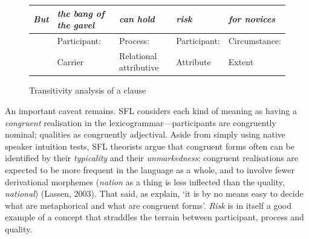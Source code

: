 \begin{figure}[htb]
\centering \small \onehalfspacing
\begin{tabularx}{0.75\textwidth}{|l|l|X|X|X|}
\hline
\emph{But}     & \emph{the bang of the gavel}             & \emph{can hold}          & \emph{risk} & \emph{for novices}          \\ \hline
~ & Participant: & Process: & Participant: & Circumstance:  \\
~ & Carrier & Relational \mbox{attributive} & Attribute &  Extent \\ \hline
\end{tabularx}
\caption{Transitivity analysis of a clause}
\label{fig:transannotation}
\end{figure}

An important caveat remains. SFL considers each kind of meaning as having a \emph{congruent} realisation in the lexicogrammar---participants are congruently nominal; qualities as congruently adjectival. Aside from simply using native speaker intuition tests, SFL theorists argue that congruent forms often can be identified by their \emph{typicality} and their \emph{unmarkedness}: congruent realisations are expected to be more frequent in the language as a whole, and to involve fewer derivational morphemes (\emph{nation} as a thing is less inflected than the quality, \emph{national}) (Lassen, 2003). That said, as  explain, `it is by no means easy to decide what are metaphorical and what are congruent forms'. \emph{Risk} is in itself a good example of a concept that straddles the terrain between participant, process and quality.

